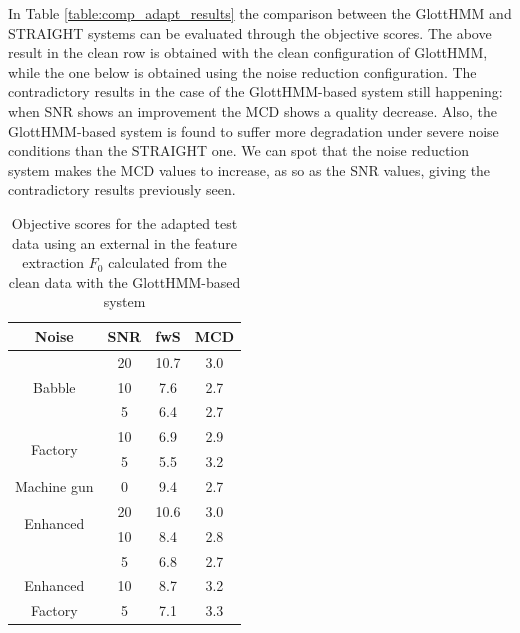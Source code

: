 In Table \ref{table:comp_adapt_results} the comparison between the GlottHMM and STRAIGHT systems can be evaluated through the objective scores.
%
The above result in the clean row is obtained with the clean configuration of GlottHMM, while the one below is obtained using the noise reduction configuration.
%
The contradictory results in the case of the GlottHMM-based system still happening: when SNR shows an improvement the MCD shows a quality decrease.
%
Also, the GlottHMM-based system is found to suffer more degradation under severe noise conditions than the STRAIGHT one.
%
We can spot that the noise reduction system makes the MCD values to increase, as so as the SNR values, giving the contradictory results previously seen.

\begin{table}[!htb]
\begin{center}
\begin{tabular}{c c | c | c}
Noise & SNR & fwS & MCD\\
\midrule
\midrule
\multirow{3}{*}{Babble} & 20 & 10.7 & 3.0\\
 & 10 & 7.6 & 2.7\\
 & 5 & 6.4 & 2.7\\
\midrule
\multirow{2}{*}{Factory} & 10 & 6.9 & 2.9\\
 & 5 & 5.5 & 3.2\\
\midrule
Machine gun & 0 & 9.4 & 2.7\\
\midrule
\midrule
\multirow{2}{*}{Enhanced} & 20 & 10.6 & 3.0\\
\multirow{2}{*}{Babble} & 10 & 8.4 & 2.8\\
& 5 & 6.8 & 2.7\\
\midrule
Enhanced & 10 & 8.7 & 3.2\\
Factory & 5 & 7.1 & 3.3\\
\bottomrule
\end{tabular}
\caption{Objective scores for the adapted test data using an external in the feature extraction $F_{0}$ calculated from the clean data with the GlottHMM-based system}
\label{table:results_ext_f0_glott}
\end{center}
\end{table}

